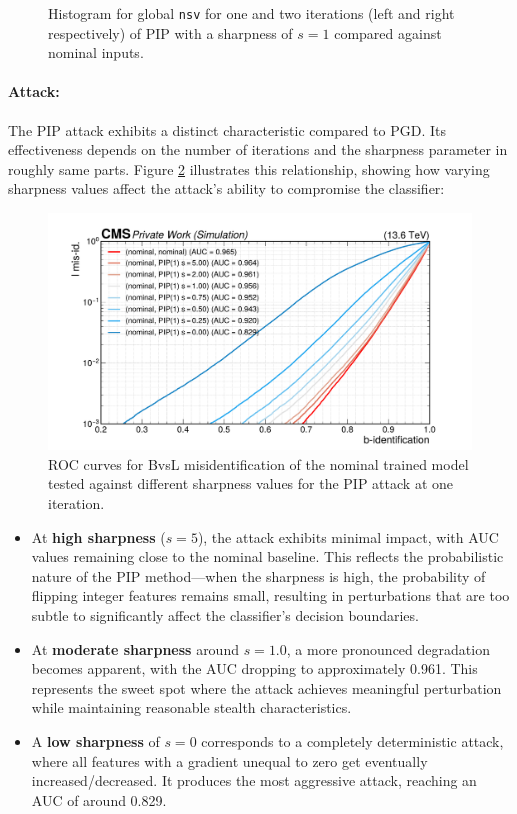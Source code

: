 \begin{figure}[htbp]
  \caption{Histogram for global \texttt{nsv} for one and two iterations (left and right respectively) of PIP with a sharpness of $s=1$ compared against nominal inputs.}
  \label{fig:intprob_severity_vtxAss}
\end{figure}

\newpage
\paragraph{Attack:} The PIP attack exhibits a distinct characteristic compared to PGD. Its effectiveness depends on the number of iterations and the sharpness parameter in roughly same parts. Figure \ref{fig:intprob_rocs_vs_sharpness} illustrates this relationship, showing how varying sharpness values affect the attack's ability to compromise the classifier:

\begin{figure}[H]
\centering
    \includegraphics[width=15cm]{media/output/roc_bvsl_intprob_sharpness.pdf}
    \caption{ROC curves for BvsL misidentification of the nominal trained model tested against different sharpness values for the PIP attack at one iteration.}
    \label{fig:intprob_rocs_vs_sharpness}
\end{figure}

\begin{itemize}
    \item At \textbf{high sharpness} ($s = 5$), the attack exhibits minimal impact, with AUC values remaining close to the nominal baseline. This reflects the probabilistic nature of the PIP method—when the sharpness is high, the probability of flipping integer features remains small, resulting in perturbations that are too subtle to significantly affect the classifier's decision boundaries.
    \item At \textbf{moderate sharpness} around $s = 1.0$, a more pronounced degradation becomes apparent, with the AUC dropping to approximately 0.961. This represents the sweet spot where the attack achieves meaningful perturbation while maintaining reasonable stealth characteristics. 
    \item A \textbf{low sharpness} of $s = 0$ corresponds to a completely deterministic attack, where all features with a gradient unequal to zero get eventually increased/decreased. It produces the most aggressive attack, reaching an AUC of around 0.829.
\end{itemize}



